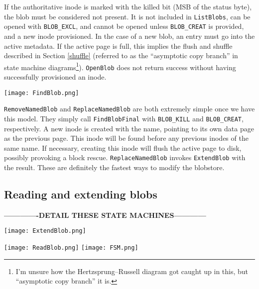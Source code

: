\documentclass[letterpaper,10pt]{article}
\begin{document}
If the authoritative inode is marked with the killed bit (MSB of the status
byte), the blob must be considered not present. It is not included in
\texttt{ListBlobs}, can be opened with \texttt{BLOB\_EXCL}, and cannot be
opened unless \texttt{BLOB\_CREAT} is provided, and a new inode provisioned.
In the case of a new blob, an entry must go into the active metadata. If the
active page is full, this implies the flush and shuffle described in
Section \ref{shuffle} (referred to as the ``asymptotic copy branch'' in state
machine diagrams\footnote{I'm unsure how the Hertzsprung–Russell diagram got
caught up in this, but ``asymptotic copy branch'' it is.}). \texttt{OpenBlob}
does not return success without having successfully provisioned an inode.

\begin{center}
\texttt{[image: FindBlob.png]}
\end{center}

\texttt{RemoveNamedBlob} and \texttt{ReplaceNamedBlob} are both extremely
simple once we have this model. They simply call \texttt{FindBlobFinal} with
\texttt{BLOB\_KILL} and \texttt{BLOB\_CREAT}, respectively. A new inode is
created with the name, pointing to its own data page as the previous page.
This inode will be found before any previous inodes of the same name. If
necessary, creating this inode will flush the active page to disk, possibly
provoking a block rescue. \texttt{ReplaceNamedBlob} invokes \texttt{ExtendBlob}
with the result. These are definitely the fastest ways to modify the blobstore.

\subsection{Reading and extending blobs}
\textbf{-------------DETAIL THESE STATE MACHINES------------}

\begin{center}
\texttt{[image: ExtendBlob.png]}
\end{center}

\begin{center}
\texttt{[image: ReadBlob.png]}
\texttt{[image: FSM.png]}
\end{center}
\end{document}
